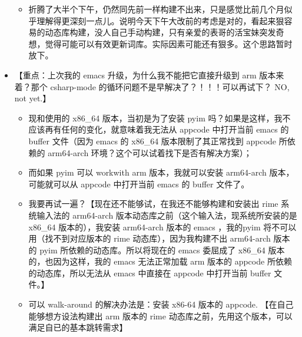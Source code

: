 \documentclass[9pt, b5paper]{article}
\begin{document}
\begin{itemize}
\begin{itemize}
\begin{itemize}
\end{itemize}
\item 折腾了大半个下午，仍然同先前一样构建不出来，只是感觉比前几个月似乎理解得更深刻一点儿。说明今天下午大改前的考虑是对的，看起来狠容易的动态库构建，没人自己手动构建，只有亲爱的表哥的活宝妹突发奇想，觉得可能可以有效更新词库。实际因素可能还有狠多。这个思路暂时放下。
\end{itemize}
\item 【重点：上次我的 emacs 升级，为什么我不能把它直接升级到 arm 版本来着？那个 csharp-mode 的循环问题不是早解决了？！！！可以再试下？ NO, not yet.】
\begin{itemize}
\item 现和使用的 x86\_64 版本，当初是为了安装 pyim 吗？如果是这样，我不应该再有任何的变化，就意味着我无法从 appcode 中打开当前 emacs 的 buffer 文件（因为 emacs 的 x86\_64 版本限制了其正常找到 appcode 所依赖的 arm64-arch 环境？这个可以试着找下是否有解决方案）；
\item 而如果 pyim 可以 workwith arm 版本，我就可以安装 arm64-arch 版本，可能就可以从 appcode 中打开当前 emacs 的 buffer 文件了。
\item 我要再试一遍？【现在还不能够试，在我还不能够构建和安装出 rime 系统输入法的 arm64-arch 版本动态库之前（这个输入法，现系统所安装的是 x86\_64 版本的），我安装 arm64-arch 版本的 emacs ，我的pyim 将不可以用（找不到对应版本的 rime 动态库），因为我构建不出 arm64-arch 版本的 pyim 所依赖的动态库。所以将现在的 emacs 委屈成了 x86\_64 版本的，也因为这样，我的 emacs 无法正常加载 arm 版本的 appcode 所依赖的动态库，所以无法从 emacs 中直接在 appcode 中打开当前 buffer 文件。】
\item 可以 walk-around 的解决办法是：安装 x86-64 版本的 appcode. 【在自己能够想方设法构建出 arm 版本的 rime 动态库之前，先用这个版本，可以满足自已的基本跳转需求】
\end{itemize}
\end{itemize}
\end{document}
